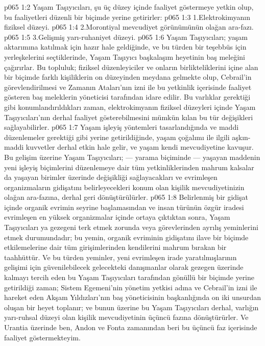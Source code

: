 \vs p065 1:2 Yaşam Taşıyıcıları, şu üç düzey içinde faaliyet göstermeye yetkin olup, bu faaliyetleri düzenli bir biçimde yerine getirirler:
\vs p065 1:3 1.\bibnobreakspace Elektrokimyanın fiziksel düzeyi.
\vs p065 1:4 2.\bibnobreakspace Morontiyal mevcudiyet görünümünün olağan ara\hyp{}fazı.
\vs p065 1:5 3.\bibnobreakspace Gelişmiş yarı\hyp{}ruhaniyet düzeyi.
\vs p065 1:6 Yaşam Taşıyıcıları; yaşam aktarımına katılmak için hazır hale geldiğinde, ve bu türden bir teşebbüs için yerleşkelerini seçtiklerinde, Yaşam Taşıyıcı başkalaşım heyetinin baş meleğini çağırırlar. Bu topluluk; fiziksel düzenleyiciler ve onların birlikteliklerini içine alan bir biçimde farklı kişiliklerin on düzeyinden meydana gelmekte olup, Cebrail’in görevlendirilmesi ve Zamanın Ataları’nın izni ile bu yetkinlik içerisinde faaliyet gösteren baş meleklerin yöneticisi tarafından idare edilir. Bu varlıklar gerektiği gibi konumlandırıldıkları zaman, elektrokimyanın fiziksel düzeyleri içinde Yaşam Taşıyıcıları’nın derhal faaliyet gösterebilmesini mümkün kılan bu tür değişikleri sağlayabilirler.
\vs p065 1:7 Yaşam işleyiş yöntemleri tasarlandığında ve maddi düzenlemeler gerektiği gibi yerine getirildiğinde, yaşam çoğalımı ile ilgili aşkın\hyp{}maddi kuvvetler derhal etkin hale gelir, ve yaşam kendi mevcudiyetine kavuşur. Bu gelişim üzerine Yaşam Taşıyıcıları; --- yarama biçiminde --- yaşayan maddenin yeni işleyiş biçimlerini düzenlemeye dair tüm yetkinliklerinden mahrum kalsalar da yaşayan birimler üzerinde değişikliği sağlayacakları ve evrimleşen organizmaların gidişatını belirleyecekleri konum olan kişilik mevcudiyetinizin olağan ara\hyp{}fazına, derhal geri dönüştürülürler.
\vs p065 1:8 Belirlenmiş bir gidişat içinde organik evrimin seyrine başlamasından ve insan türünün özgür iradesi evrimleşen en yüksek organizmalar içinde ortaya çıktıktan sonra, Yaşam Taşıyıcıları ya gezegeni terk etmek zorunda veya görevlerinden ayrılış yeminlerini etmek durumundadır; bu yemin, organik evriminin gidişatını ilave bir biçimde etkilemelerine dair tüm girişimlerinden kendilerini mahrum bırakan bir taahhüttür. Ve bu türden yeminler, yeni evrimleşen irade yaratılmışlarının gelişimi için güvenilebilecek gelecekteki danışmanlar olarak gezegen üzerinde kalmayı tercih eden bu Yaşam Taşıyıcıları tarafından gönüllü bir biçimde yerine getirildiği zaman; Sistem Egemeni’nin yönetim yetkisi adına ve Cebrail’in izni ile hareket eden Akşam Yıldızları’nın baş yöneticisinin başkanlığında on iki unsurdan oluşan bir heyet toplanır; ve bunun üzerine bu Yaşam Taşıyıcıları derhal, varlığın yarı\hyp{}ruhsal düzeyi olan kişilik mevcudiyetinin üçüncü fazına dönüştürürler. Ve Urantia üzerinde ben, Andon ve Fonta zamanından beri bu üçüncü faz içerisinde faaliyet göstermekteyim.
